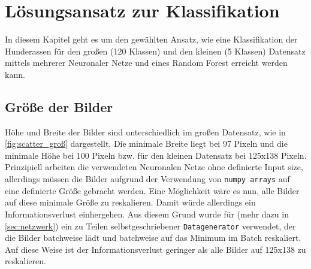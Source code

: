 \section{Lösungsansatz zur Klassifikation}
In diesem Kapitel geht es um den gewählten Ansatz, wie eine Klassifikation der
Hunderassen für den großen (120 Klassen) und den kleinen (5 Klassen) Datensatz
mittels mehrerer Neuronaler Netze und eines Random Forest erreicht werden kann.

\subsection{Größe der Bilder}
\label{sec:größe-bilder}


Höhe und Breite der Bilder sind unterschiedlich im großen Datensatz, wie in
\autoref{fig:scatter_groß} dargestellt. Die minimale Breite liegt bei 97 Pixeln
und die minimale Höhe bei 100 Pixeln bzw. für den kleinen Datensatz bei 125x138
Pixeln. Prinzipiell arbeiten die verwendeten Neuronalen Netze ohne definierte
Input size, allerdings müssen die Bilder aufgrund der Verwendung von
\texttt{numpy arrays} auf eine definierte Größe gebracht werden. Eine
Möglichkeit wäre es nun, alle Bilder auf diese minimale Größe zu reskalieren. Damit
würde allerdings ein Informationsverlust einhergehen. Aus diesem Grund wurde für
\MiniDog{} (mehr dazu in \autoref{sec:netzwerk}) ein zu Teilen
selbstgeschriebener \texttt{Datagenerator} verwendet, der die Bilder batchweise
lädt und batchweise auf das Minimum im Batch reskaliert. Auf diese Weise ist der
Informationsverlust geringer als alle Bilder auf 125x138 zu reskalieren.


